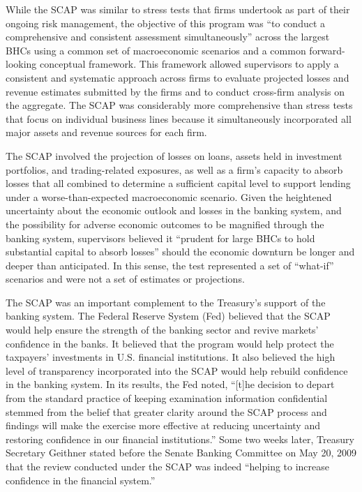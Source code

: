 \documentclass[justified, nobib]{tufte-handout2}
\begin{document}
While the SCAP was similar to stress tests that firms undertook as part
of their ongoing risk management, the objective of this program was ``to
conduct a comprehensive and consistent assessment simultaneously''
across the largest BHCs using a common set of macroeconomic scenarios
and a common forward-looking conceptual framework. This framework
allowed supervisors to apply a consistent and systematic approach across
firms to evaluate projected losses and revenue estimates submitted by
the firms and to conduct cross-firm analysis on the aggregate. The SCAP
was considerably more comprehensive than stress tests that focus on
individual business lines because it simultaneously incorporated all
major assets and revenue sources for each firm.\citep{Design}

The SCAP involved the projection of losses on loans, assets held in
investment portfolios, and trading-related exposures, as well as a
firm's capacity to absorb losses that all combined to determine a
sufficient capital level to support lending under a worse-than-expected
macroeconomic scenario. Given the heightened uncertainty about the
economic outlook and losses in the banking system, and the possibility
for adverse economic outcomes to be magnified through the banking
system, supervisors believed it ``prudent for large BHCs to hold
substantial capital to absorb losses'' should the economic downturn be
longer and deeper than anticipated.\citep{Design} In this sense, the
test represented a set of ``what-if'' scenarios and were not a set of
estimates or projections.\citep{Results}

The SCAP was an important complement to the Treasury's support of the
banking system. The Federal Reserve System (Fed) believed that the SCAP
would help ensure the strength of the banking sector and revive markets'
confidence in the banks. It believed that the program would help protect
the taxpayers' investments in U.S. financial institutions.\citep{Results} It also believed the high level of transparency incorporated into the SCAP would help
rebuild confidence in the banking system. In its results, the Fed noted,
``{[}t{]}he decision to depart from the standard practice of keeping
examination information confidential stemmed from the belief that
greater clarity around the SCAP process and findings will make the
exercise more effective at reducing uncertainty and restoring confidence
in our financial institutions.'' Some two weeks later, Treasury
Secretary Geithner stated before the Senate Banking Committee on
May 20, 2009 that the review conducted under the SCAP was indeed
``helping to increase confidence in the financial system.''
\end{document}
